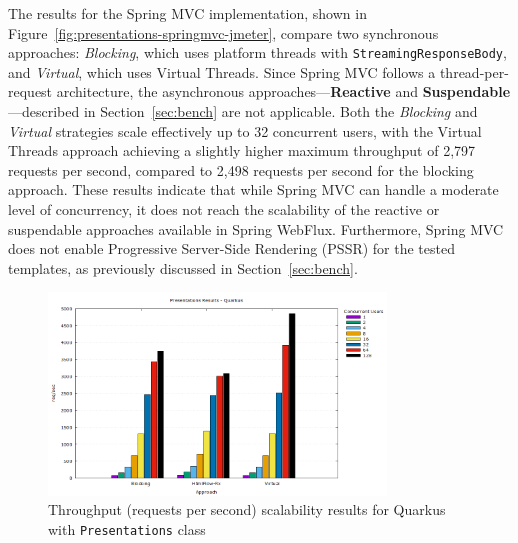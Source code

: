 The results for the Spring MVC implementation, shown in
Figure~\ref{fig:presentations-springmvc-jmeter}, compare two synchronous
approaches: \textit{Blocking}, which uses platform threads with
\texttt{StreamingResponseBody}, and \textit{Virtual}, which uses Virtual
Threads. Since Spring MVC follows a thread-per-request architecture, the
asynchronous approaches—\textbf{Reactive} and \textbf{Suspendable}—described in
Section~\ref{sec:bench} are not applicable. Both the \textit{Blocking} and
\textit{Virtual} strategies scale effectively up to 32 concurrent users, with
the Virtual Threads approach achieving a slightly higher maximum throughput of
2,797 requests per second, compared to 2,498 requests per second for the
blocking approach. These results indicate that while Spring MVC can handle a
moderate level of concurrency, it does not reach the scalability of the
reactive or suspendable approaches available in Spring WebFlux. Furthermore,
Spring MVC does not enable Progressive Server-Side Rendering (PSSR) for the
tested templates, as previously discussed in Section~\ref{sec:bench}.

\begin{figure}[h]
     \centering
     \includegraphics[width=0.8\textwidth]{./Graphs/presentations-quarkus-jmeter.png}
     \caption{Throughput (requests per second) scalability results for Quarkus with \texttt{Presentations} class}\label{fig:presentations-quarkus-jmeter}
\end{figure}

